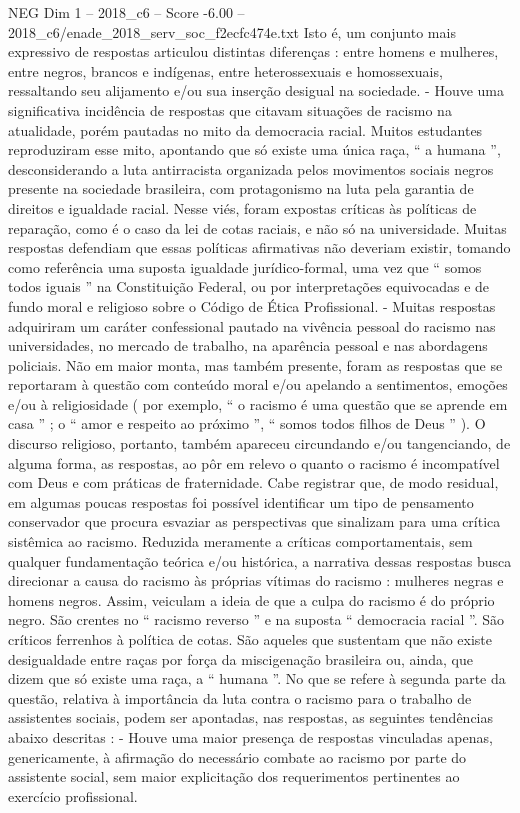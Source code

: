 \begin{textsample}{NEG Dim 1 – 2018\_c6 – Score -6.00 – 2018\_c6/enade\_2018\_serv\_soc\_f2ecfc474e.txt}
Isto é, um conjunto mais expressivo de respostas articulou distintas diferenças : entre homens e mulheres, entre negros, brancos e indígenas, entre heterossexuais e homossexuais, ressaltando seu alijamento e/ou sua inserção desigual na sociedade. - Houve uma significativa incidência de respostas que citavam situações de racismo na atualidade, porém pautadas no mito da democracia racial.
Muitos estudantes reproduziram esse mito, apontando que só existe uma única raça, “ a humana ”, desconsiderando a luta antirracista organizada pelos movimentos sociais negros presente na sociedade brasileira, com protagonismo na luta pela garantia de direitos e igualdade racial.
Nesse viés, foram expostas críticas às políticas de reparação, como é o caso da lei de cotas raciais, e não só na universidade.
Muitas respostas defendiam que essas políticas afirmativas não deveriam existir, tomando como referência uma suposta igualdade jurídico-formal, uma vez que “ somos todos iguais ” na Constituição Federal, ou por interpretações equivocadas e de fundo moral e religioso sobre o Código de Ética Profissional. - Muitas respostas adquiriram um caráter confessional pautado na vivência pessoal do racismo nas universidades, no mercado de trabalho, na aparência pessoal e nas abordagens policiais.
Não em maior monta, mas também presente, foram as respostas que se reportaram à questão com conteúdo moral e/ou apelando a sentimentos, emoções e/ou à religiosidade ( por exemplo, “ o racismo é uma questão que se aprende em casa ” ; o “ amor e respeito ao próximo ”, “ somos todos filhos de Deus ” ).
O discurso religioso, portanto, também apareceu circundando e/ou tangenciando, de alguma forma, as respostas, ao pôr em relevo o quanto o racismo é incompatível com Deus e com práticas de fraternidade.
Cabe registrar que, de modo residual, em algumas poucas respostas foi possível identificar um tipo de pensamento conservador que procura esvaziar as perspectivas que sinalizam para uma crítica sistêmica ao racismo.
Reduzida meramente a críticas comportamentais, sem qualquer fundamentação teórica e/ou histórica, a narrativa dessas respostas busca direcionar a causa do racismo às próprias vítimas do racismo : mulheres negras e homens negros.
Assim, veiculam a ideia de que a culpa do racismo é do próprio negro.
São crentes no “ racismo reverso ” e na suposta “ democracia racial ”.
São críticos ferrenhos à política de cotas.
São aqueles que sustentam que não existe desigualdade entre raças por força da miscigenação brasileira ou, ainda, que dizem que só existe uma raça, a “ humana ”.
No que se refere à segunda parte da questão, relativa à importância da luta contra o racismo para o trabalho de assistentes sociais, podem ser apontadas, nas respostas, as seguintes tendências abaixo descritas : - Houve uma maior presença de respostas vinculadas apenas, genericamente, à afirmação do necessário combate ao racismo por parte do assistente social, sem maior explicitação dos requerimentos pertinentes ao exercício profissional.

\end{textsample}
